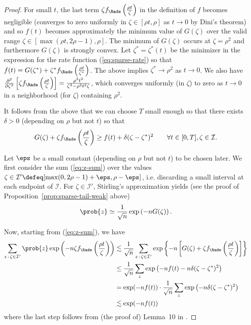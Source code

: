 \documentclass{article}
\begin{document}
\begin{proof}
For small $t$, the last term $\zeta f_\Rade\left(\frac{\rho t}{\zeta}\right)$ in the definition of $f$ becomes negligible (converges to zero uniformly in $\zeta \in [\rho t,\rho]$ as $t \to 0$ by Dini's theorem) and so $f(t)$ becomes approximately the minimum value of $G(\zeta)$ over the valid range $\zeta \in [\max(\rho t,2\rho-1),\rho]$.
The minimum of $G(\zeta)$ occurs at $\zeta = \rho^2$
and furthermore $G(\zeta)$ is strongly convex. Let $\zeta^* = \zeta^*(t)$ be the minimizer in the expression for the rate function (\ref{eq:sparse-rate}) so that $f(t) = G(\zeta^*) + \zeta^* f_\Rade\left(\frac{\rho t}{\zeta^*}\right)$. The above implies $\zeta^* \to \rho^2$ as $t \to 0$. We also have $\frac{\partial^2}{\partial \zeta^2}\left[\zeta f_\Rade\left(\frac{\rho t}{\zeta}\right)\right] = \frac{\rho^2 t^2}{\zeta^3 - \rho^2 t^2 \zeta}$, which converges uniformly (in $\zeta$) to zero as $t \to 0$ in a neighborhood (for $\zeta$) containing $\rho^2$.

It follows from the above that we can choose $T$ small enough so that there exists $\delta > 0$ (depending on $\rho$ but not $t$) so that
$$G(\zeta) + \zeta f_\Rade\left(\frac{\rho t}{\zeta}\right) \ge f(t) + \delta (\zeta - \zeta^*)^2 \qquad \forall t \in [0,T], \zeta \in \mathcal{I}.$$

Let $\eps$ be a small constant (depending on $\rho$ but not $t$) to be chosen later. We first consider the sum (\ref{eq:z-sum}) over the values $\zeta \in \mathcal{I}' \defeq [\max(0,2\rho-1) + \eps, \rho - \eps]$, i.e. discarding a small interval at each endpoint of $\mathcal{I}$. For $\zeta \in \mathcal{I}'$, Stirling's approximation yields (see the proof of Proposition~\ref{prop:sparse-tail-weak} above)
$$\prob{z} \simeq \frac{1}{\sqrt n} \exp\left(-nG(\zeta)\right).$$

\noindent Now, starting from (\ref{eq:z-sum}), we have
\begin{align*}
\sum_{z \, :\, \zeta \in \mathcal{I}'} \prob{z} \exp\left(-n \zeta f_\Rade\left(\frac{\rho t}{\zeta}\right)\right)
&\lesssim \frac{1}{\sqrt n} \sum_{z \, :\, \zeta \in \mathcal{I}'} \exp\left\{-n\left[G(\zeta) + \zeta f_\Rade\left(\frac{\rho t}{\zeta}\right)\right]\right\} \\
&\le \frac{1}{\sqrt n} \sum_{z} \exp\left(-n f(t) - n \delta (\zeta - \zeta^*)^2 \right) \\
&= \exp(-n f(t)) \cdot \frac{1}{\sqrt n} \sum_{z} \exp\left(-n \delta (\zeta - \zeta^*)^2 \right) \\
&\lesssim \exp(-nf(t))
\end{align*}
where the last step follows from (the proof of) Lemma~10 in \cite{bmnn}.


\end{proof}
\end{document}
